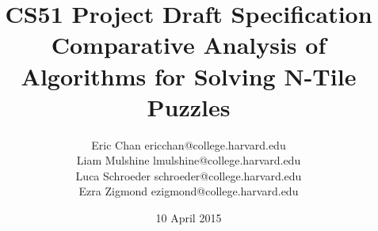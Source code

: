 \documentclass[12pt]{article}
\begin{document}
\title{
  CS51 Project Draft Specification\\
  \Large{Comparative Analysis of Algorithms for Solving N-Tile Puzzles}
}
\author{Eric Chan ericchan@college.harvard.edu \\ Liam Mulshine lmulshine@college.harvard.edu \\ Luca Schroeder schroeder@college.harvard.edu \\ Ezra Zigmond ezigmond@college.harvard.edu \\ }
\date{10 April 2015}
\maketitle
\end{document}
